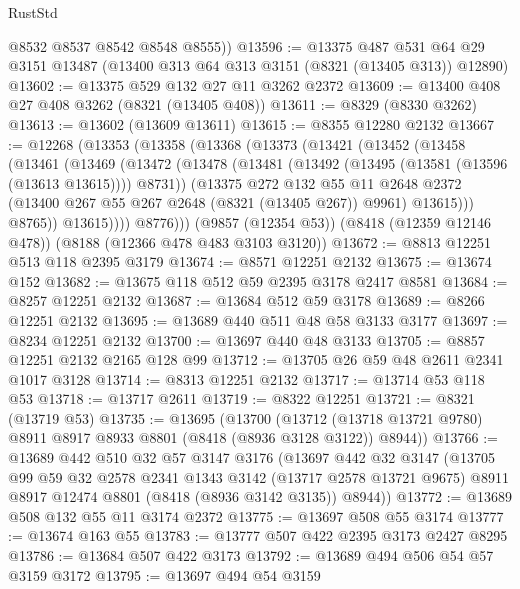 \begin{lexlean}{RustStd}
\begin{coremodule}
        @8532
        @8537
        @8542
        @8548
        @8555))
@13596 := @13375
    @487
    @531
    @64
    @29
    @3151
    @13487
    (@13400 @313 @64 @313 @3151 (@8321 (@13405 @313)) @12890)
@13602 := @13375 @529 @132 @27 @11 @3262 @2372
@13609 := @13400 @408 @27 @408 @3262 (@8321 (@13405 @408))
@13611 := @8329 (@8330 @3262)
@13613 := @13602 (@13609 @13611)
@13615 := @8355 @12280 @2132
@13667 := @12268
    (@13353
      (@13358
        (@13368
          (@13373
            (@13421
              (@13452
                (@13458
                  (@13461
                    (@13469
                      (@13472
                        (@13478
                          (@13481 (@13492 (@13495 (@13581 (@13596 (@13613 @13615)))) @8731))
                          (@13375
                            @272
                            @132
                            @55
                            @11
                            @2648
                            @2372
                            (@13400 @267 @55 @267 @2648 (@8321 (@13405 @267)) @9961)
                            @13615)))
                      @8765))
                  @13615))))
          @8776)))
    (@9857 (@12354 @53))
    (@8418 (@12359 @12146 @478))
    (@8188 (@12366 @478 @483 @3103 @3120))
@13672 := @8813 @12251 @513 @118 @2395 @3179
@13674 := @8571 @12251 @2132
@13675 := @13674 @152
@13682 := @13675 @118 @512 @59 @2395 @3178 @2417 @8581
@13684 := @8257 @12251 @2132
@13687 := @13684 @512 @59 @3178
@13689 := @8266 @12251 @2132
@13695 := @13689 @440 @511 @48 @58 @3133 @3177
@13697 := @8234 @12251 @2132
@13700 := @13697 @440 @48 @3133
@13705 := @8857 @12251 @2132 @2165 @128 @99
@13712 := @13705 @26 @59 @48 @2611 @2341 @1017 @3128
@13714 := @8313 @12251 @2132
@13717 := @13714 @53 @118 @53
@13718 := @13717 @2611
@13719 := @8322 @12251
@13721 := @8321 (@13719 @53)
@13735 := @13695
    (@13700
      (@13712 (@13718 @13721 @9780) @8911 @8917 @8933 @8801 (@8418 (@8936 @3128 @3122)) @8944))
@13766 := @13689
    @442
    @510
    @32
    @57
    @3147
    @3176
    (@13697
      @442
      @32
      @3147
      (@13705
        @99
        @59
        @32
        @2578
        @2341
        @1343
        @3142
        (@13717 @2578 @13721 @9675)
        @8911
        @8917
        @12474
        @8801
        (@8418 (@8936 @3142 @3135))
        @8944))
@13772 := @13689 @508 @132 @55 @11 @3174 @2372
@13775 := @13697 @508 @55 @3174
@13777 := @13674 @163 @55
@13783 := @13777 @507 @422 @2395 @3173 @2427 @8295
@13786 := @13684 @507 @422 @3173
@13792 := @13689 @494 @506 @54 @57 @3159 @3172
@13795 := @13697 @494 @54 @3159

\end{coremodule}
\end{lexlean}
